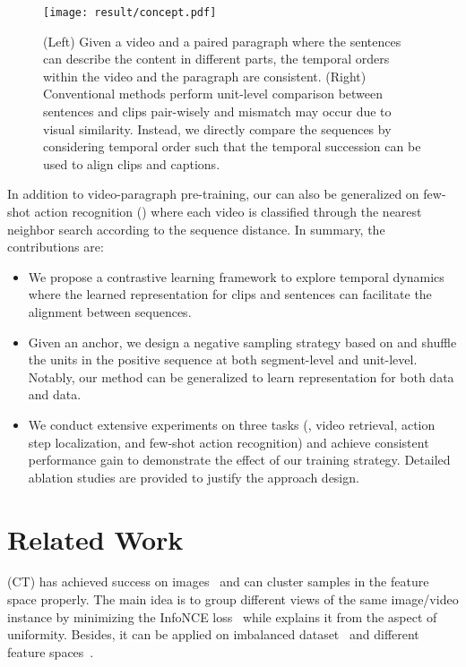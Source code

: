 \begin{figure}
    \centering
    \texttt{[image: result/concept.pdf]}
    \caption{(Left) Given a video and a paired paragraph where the sentences can describe the content in different parts, the temporal orders within the video and the paragraph are consistent. (Right) Conventional methods perform unit-level comparison between sentences and clips pair-wisely and mismatch may occur due to visual similarity. Instead, we directly compare the sequences by considering temporal order such that the temporal succession can be used to align clips and captions.}
    \label{fig:concept}
\end{figure}

In addition to video-paragraph pre-training, our \approach{} can also be generalized on few-shot action recognition (\votype{}) where each video is classified through the nearest neighbor search according to the sequence distance. 
In summary, the contributions are:
\begin{itemize}[leftmargin=*]
    \item We propose a contrastive learning framework \approach{} to explore temporal dynamics where the learned representation for clips and sentences can facilitate the alignment between sequences.  
    \item Given an anchor, we design a negative sampling strategy based on \negkey{} and shuffle the units in the positive sequence at both segment-level and unit-level. Notably, our method can be generalized to learn representation for both \vltype{} data and \votype{} data.
    \item We conduct extensive experiments on three tasks (\ie, video retrieval, action step localization, and few-shot action recognition) and achieve consistent performance gain to demonstrate the effect of our training strategy. Detailed ablation studies are provided to justify the approach design.
\end{itemize}

\section{Related Work}

 (CT) has achieved success on images~\citep{chen2020improved,he2020momentum} and can cluster samples in the feature space properly.
The main idea is to group different views of the same image/video instance by minimizing the InfoNCE loss~\citep{oord2018representation} while \citet{wang2020understanding} explains it from the aspect of uniformity. Besides, it can be applied on imbalanced dataset~\citep{caron2020unsupervised} and different feature spaces~\citep{grill2020bootstrap,ma2021partner}.

